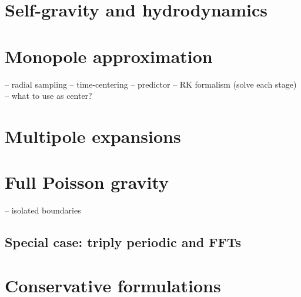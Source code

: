 \section{Self-gravity and hydrodynamics}

\section{Monopole approximation}

 -- radial sampling
 -- time-centering
 -- predictor
 -- RK formalism (solve each stage)
 -- what to use as center?

\section{Multipole expansions}


\section{Full Poisson gravity}

 -- isolated boundaries

\subsection{Special case: triply periodic and FFTs}


\section{Conservative formulations}




